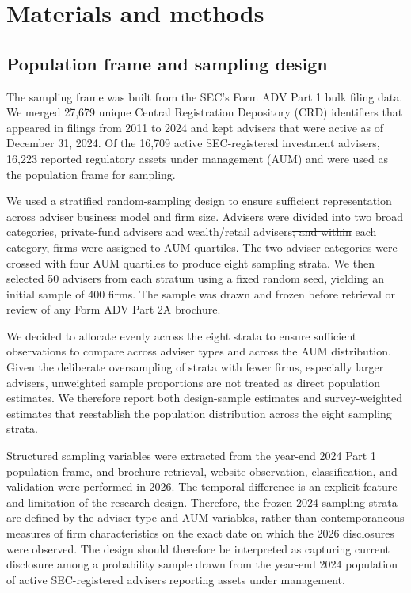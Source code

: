 \documentclass[utf8]{FrontiersinHarvard}
\makeatletter
\providecommand{\DIFaddtex}[1]{{\protect\color{blue}\uwave{#1}}} %
\providecommand{\DIFdeltex}[1]{{\protect\color{red}\sout{#1}}} %
\providecommand{\DIFaddbegin}{} %
\providecommand{\DIFaddend}{} %
\providecommand{\DIFdelbegin}{} %
\providecommand{\DIFdelend}{} %
\providecommand{\DIFadd}[1]{\texorpdfstring{\DIFaddtex{#1}}{#1}} %
\providecommand{\DIFdel}[1]{\texorpdfstring{\DIFdeltex{#1}}{}} %
\let\sout@orig\sout %
\renewcommand{\sout}[1]{\ifmmode\text{\sout@orig{\ensuremath{#1}}}\else\sout@orig{#1}\fi} %
\makeatother
\begin{document}
\section{Materials and methods}

\subsection{Population frame and sampling design}

The sampling frame was built from the SEC's Form ADV Part 1 bulk filing data. We merged 27{,}679 unique Central Registration Depository (CRD) identifiers that appeared in filings from 2011 to 2024 and kept advisers that were active as of December 31, 2024. Of the 16{,}709 active SEC-registered investment advisers, 16{,}223 reported regulatory assets under management (AUM) and were used as the population frame for sampling.

We used a stratified random-sampling design to ensure sufficient representation across adviser business model and firm size. Advisers were divided into two broad categories, private-fund advisers and wealth/retail advisers\DIFdelbegin \DIFdel{; and within }\DIFdelend \DIFaddbegin \DIFadd{. Within }\DIFaddend each category, firms were assigned to AUM quartiles. The two adviser categories were crossed with four AUM quartiles to produce eight sampling strata. We then selected 50 advisers from each stratum using a fixed random seed, yielding an initial sample of 400 firms. The sample was drawn and frozen before retrieval or review of any Form ADV Part 2A brochure.

We decided to allocate evenly across the eight strata to ensure sufficient observations to compare across adviser types and across the AUM distribution. Given the deliberate oversampling of strata with fewer firms, especially larger advisers, unweighted sample proportions are not treated as direct population estimates. We therefore report both design-sample estimates and survey-weighted estimates that reestablish the population distribution across the eight sampling strata.

Structured sampling variables were extracted from the year-end 2024 Part 1 population frame, and brochure retrieval, website observation, classification, and validation were performed in 2026. The temporal difference is an explicit feature and limitation of the research design. Therefore, the frozen 2024 sampling strata are defined by the adviser type and AUM variables, rather than contemporaneous measures of firm characteristics on the exact date on which the 2026 disclosures were observed. The design should therefore be interpreted as capturing current disclosure among a probability sample drawn from the year-end 2024 population of active SEC-registered advisers reporting assets under management.
\end{document}
